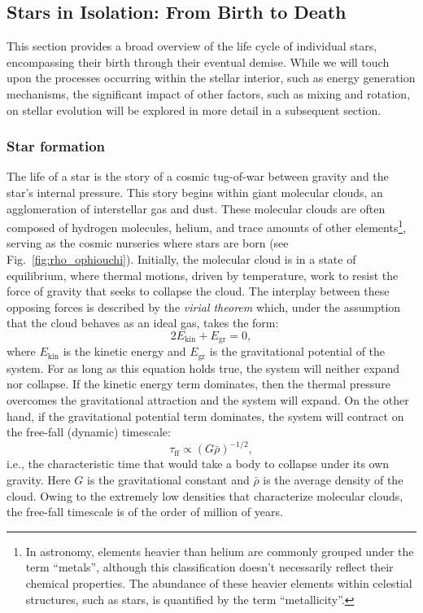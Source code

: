 \documentclass[main.tex]{subfiles}
\begin{document}
    

    \newpage
    \subsection{Stars in Isolation: From Birth to Death}
    This section provides a broad overview of the life cycle of individual stars, encompassing their birth through their eventual demise. While we will touch upon the processes occurring within the stellar interior, such as energy generation mechanisms, the significant impact of other factors, such as mixing and rotation, on stellar evolution will be explored in more detail in a subsequent section.
    
    \subsubsection{Star formation}
    The life of a star is the story of a cosmic tug-of-war between gravity and the star's internal pressure. This story begins within giant molecular clouds, an agglomeration of interstellar gas and dust. These molecular clouds are often composed of hydrogen molecules, helium, and trace amounts of other elements\footnote{In astronomy, elements heavier than helium are commonly grouped under the term ``metals'', although this classification doesn't necessarily reflect their chemical properties. The abundance of these heavier elements within celestial structures, such as stars, is quantified by the term ``metallicity''.}, serving as the cosmic nurseries where stars are born (see Fig.~\ref{fig:rho_ophiouchi}).
    Initially, the molecular cloud is in a state of equilibrium, where thermal motions, driven by temperature, work to resist the force of gravity that seeks to collapse the cloud. The interplay between these opposing forces is described by the \textit{virial theorem} which, under the assumption that the cloud behaves as an ideal gas, takes the form:
    \begin{equation}\label{eq:virial}
        2E_\mathrm{kin} + E_\mathrm{gr} = 0,
    \end{equation}
    where $E_\mathrm{kin}$ is the kinetic energy and $E_\mathrm{gr}$ is the gravitational potential of the system. For as long as this equation holds true, the system will neither expand nor collapse. If the kinetic energy term dominates, then the thermal pressure overcomes the gravitational attraction and the system will expand. On the other hand, if the gravitational potential term dominates, the system will contract on the free-fall (dynamic) timescale:
    \begin{equation}\label{eq:dynamical_timescale}
        \tau_\mathrm{ff} \propto (G\bar{\rho})^{-1/2},
    \end{equation}
    i.e., the characteristic time that would take a body to collapse under its own gravity. Here $G$ is the gravitational constant and $\bar{\rho}$ is the average density of the cloud. Owing to the extremely low densities that characterize molecular clouds, the free-fall timescale is of the order of million of years.
\end{document}
